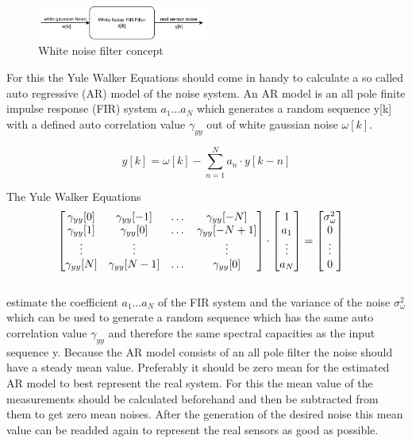   \begin{figure}[h!]
 \centering
 \includegraphics[width=0.5\textwidth]{./Pictures/WhiteNoiseFilter.pdf}
 \caption{White noise filter concept}
 \label{fig:WhiteNoiseFilter}
\end{figure}


  For this the Yule Walker Equations should come in handy to calculate a so called auto regressive (AR) model of the noise system.
  An AR model is an all pole finite impulse response (FIR) system $a_1 \hdots a_N$ which generates a random sequence y[k] with a defined auto correlation value $\gamma_{yy}$ out of white gaussian noise $\omega[k]$.

  $$ y[k] = \omega[k] - \sum_{n=1}^{N} a_n \cdot y[k-n]  $$

  \newpage
  The Yule Walker Equations
  \begin{align*}
    \begin{bmatrix}
     \gamma_{yy}[0] & \gamma_{yy}[-1] & \dots & \gamma_{yy}[-N] \\
     \gamma_{yy}[1] & \gamma_{yy}[0] & \dots & \gamma_{yy}[-N+1] \\
     \vdots 		& \vdots 	& 	& \vdots	\\
     \gamma_{yy}[N] & \gamma_{yy}[N-1] & \dots & \gamma_{yy}[0]
    \end{bmatrix}
    & \cdot
    \begin{bmatrix}
     1 \\
     a_1 \\
     \vdots \\
     a_N
    \end{bmatrix}
    =
    \begin{bmatrix}
     \sigma^2_\omega \\
     0 \\
     \vdots \\
     0
    \end{bmatrix}
    \hfill
  \end{align*}
  \hfil \\
  estimate the coefficient $a_1 \dots a_N $ of the FIR system and the variance of the noise $\sigma^2_\omega $ which can be used to generate a random sequence which has the same auto correlation value $\gamma_{yy}$ and therefore the same spectral capacities as the input sequence y.
  Because the AR model consists of an all pole filter the noise should have a steady mean value. Preferably it should be zero mean for the estimated AR model to best represent the real system.
  For this the mean value of the measurements should be calculated beforehand and then be subtracted from them to get zero mean noises.
  After the generation of the desired noise this mean value can be readded again to represent the real sensors as good as possible.


